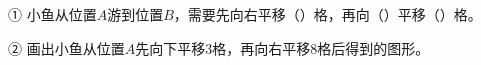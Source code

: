 \noindent{}\par\vspace{2mm}
① 小鱼从位置$A$游到位置$B$，需要先向右平移（\quad）格，再向（\quad）平移（\quad）格。\par\vspace{3mm}
② 画出小鱼从位置$A$先向下平移3格，再向右平移8格后得到的图形。\par

